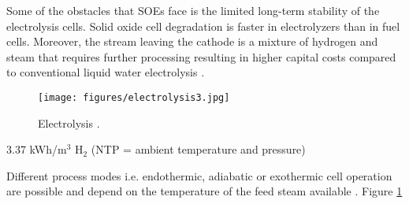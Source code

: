 \documentclass[11pt,letterpaper]{article}
\begin{document}
Some of the obstacles that \glspl{SOE} face is the limited long-term stability of the electrolysis cells. Solid oxide cell degradation is faster in electrolyzers than in fuel cells. Moreover, the stream leaving the cathode is a mixture of hydrogen and steam that requires further processing resulting in higher capital costs compared to conventional liquid water electrolysis \cite{ursua_hydrogen_2012}.

\begin{figure}[] %
	\centering
	\texttt{[image: figures/electrolysis3.jpg]}
	\hfill
	\caption{ Electrolysis \cite{doenitz_concepts_1982}.}
	\label{fig:electro3}
\end{figure}

3.37 kWh/m$^3$ H$_2$ (NTP = ambient temperature and pressure)
\cite{helmeth_high_2020}

Different process modes i.e. endothermic, adiabatic or exothermic cell operation are possible and depend on the temperature of the feed steam available \cite{doenitz_concepts_1982}. Figure \ref{fig:electro3}

\pagebreak


\end{document}
